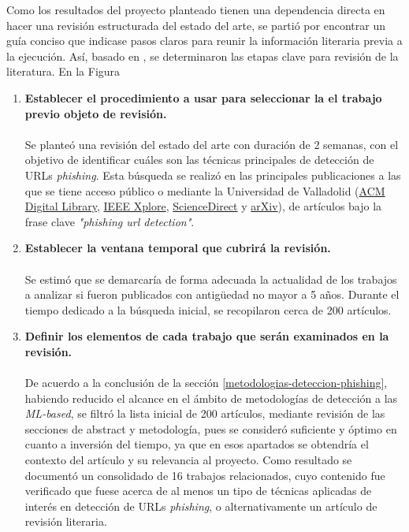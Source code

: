 Como los resultados del proyecto planteado tienen una dependencia directa en hacer una revisión estructurada del estado del arte, se partió por encontrar un guía conciso que indicase pasos claros para reunir la información literaria previa a la ejecución. Así, basado en \cite{peggy2021}, se determinaron las etapas clave para revisión de la literatura. En la Figura 

\begin{enumerate}
    \item \textbf{Establecer el procedimiento a usar para seleccionar la el trabajo previo objeto de revisión.}\\\\
          Se planteó una revisión del estado del arte con duración de 2 semanas, con el objetivo de identificar cuáles son las técnicas principales de detección de URLs \textit{phishing}. Esta búsqueda se realizó en las principales publicaciones a las que se tiene acceso público o mediante la Universidad de Valladolid (\href{https://dl.acm.org/}{ACM Digital Library}, \href{https://ieeexplore.ieee.org/}{IEEE Xplore}, \href{https://www.sciencedirect.com/}{ScienceDirect} y \href{https://arxiv.org/}{arXiv}), de artículos bajo la frase clave \textit{"phishing url detection"}.
    \item \textbf{Establecer la ventana temporal que cubrirá la revisión.}\\\\
          Se estimó que se demarcaría de forma adecuada la actualidad de los trabajos a analizar si fueron publicados con antigüedad no mayor a 5 años. Durante el tiempo dedicado a la búsqueda inicial, se recopilaron cerca de 200 artículos.
    \item \textbf{Definir los elementos de cada trabajo que serán examinados en la revisión.}\\\\
          De acuerdo a la conclusión de la sección \ref{metodologias-deteccion-phishing}, habiendo reducido el alcance en el ámbito de metodologías de detección a las \textit{ML-based}, se filtró la lista inicial de 200 artículos, mediante revisión de las secciones de abstract y metodología, pues se consideró suficiente y óptimo en cuanto a inversión del tiempo, ya que en esos apartados se obtendría el contexto del artículo y su relevancia al proyecto. Como resultado se documentó un consolidado de 16 trabajos relacionados, cuyo contenido fue verificado que fuese acerca de al menos un tipo de técnicas aplicadas de interés en detección de URLs \textit{phishing}, o alternativamente un artículo de revisión literaria.
\end{enumerate}

